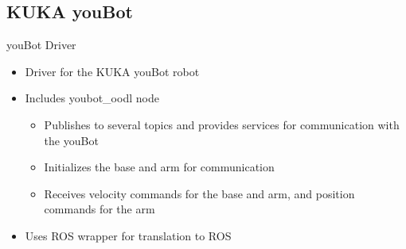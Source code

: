 \subsection{KUKA youBot}
\begin{frame}{youBot Driver}
\begin{itemize}
	\item Driver for the KUKA youBot robot
	\item Includes youbot\_oodl node 
		\begin{itemize}
			\item Publishes to several topics and provides services for communication with the youBot
			\item Initializes the base and arm for communication
			\item Receives velocity commands for the base and arm, and position commands for the arm 
		
		\end{itemize}
	\item Uses ROS wrapper for translation to ROS
\end{itemize}

  
\end{frame}

